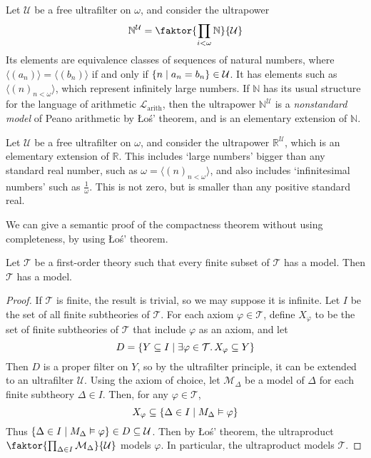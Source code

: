 \begin{example}
    Let \( \mathcal U \) be a free ultrafilter on \( \omega \), and consider the ultrapower
    \[ \mathbb N^{\mathcal U} = \faktor{\prod_{i < \omega} \mathbb N}{\mathcal U} \]
    Its elements are equivalence classes of sequences of natural numbers, where \( \langle(a_n)\rangle = \langle(b_n)\rangle \) if and only if \( \qty{n \mid a_n = b_n} \in \mathcal U \).
    It has elements such as \( \langle (n)_{n < \omega} \rangle \), which represent infinitely large numbers.
    If \( \mathbb N \) has its usual structure for the language of arithmetic \( \mathcal L_{\text{arith}} \), then the ultrapower \( \mathbb N^{\mathcal U} \) is a \emph{nonstandard model} of Peano arithmetic by \L{}o\'s' theorem, and is an elementary extension of \( \mathbb N \).
\end{example}
\begin{example}
    Let \( \mathcal U \) be a free ultrafilter on \( \omega \), and consider the ultrapower \( \mathbb R^{\mathcal U} \), which is an elementary extension of \( \mathbb R \).
    This includes `large numbers' bigger than any standard real number, such as \( \omega = \langle (n)_{n < \omega} \rangle \), and also includes `infinitesimal numbers' such as \( \frac{1}{\omega} \).
    This is not zero, but is smaller than any positive standard real.
\end{example}
We can give a semantic proof of the compactness theorem without using completeness, by using \L{}o\'s' theorem.
\begin{corollary}
    Let \( \mathcal T \) be a first-order theory such that every finite subset of \( \mathcal T \) has a model.
    Then \( \mathcal T \) has a model.
\end{corollary}
\begin{proof}
    If \( \mathcal T \) is finite, the result is trivial, so we may suppose it is infinite.
    Let \( I \) be the set of all finite subtheories of \( \mathcal T \).
    For each axiom \( \varphi \in \mathcal T \), define \( X_\varphi \) to be the set of finite subtheories of \( \mathcal T \) that include \( \varphi \) as an axiom, and let
    \[ D = \qty{Y \subseteq I \mid \exists \varphi \in \mathcal T.\, X_\varphi \subseteq Y} \]
    Then \( D \) is a proper filter on \( Y \), so by the ultrafilter principle, it can be extended to an ultrafilter \( \mathcal U \).
    Using the axiom of choice, let \( \mathcal M_\Delta \) be a model of \( \Delta \) for each finite subtheory \( \Delta \in I \).
    Then, for any \( \varphi \in \mathcal T \),
    \[ X_\varphi \subseteq \qty{\Delta \in I \mid M_\Delta \vDash \varphi} \]
    Thus \( \qty{\Delta \in I \mid M_\Delta \vDash \varphi} \in D \subseteq \mathcal U \).
    Then by \L{}o\'s' theorem, the ultraproduct \( \faktor{\prod_{\Delta \in I} \mathcal M_\Delta}{\mathcal U} \) models \( \varphi \).
    In particular, the ultraproduct models \( \mathcal T \).
\end{proof}
